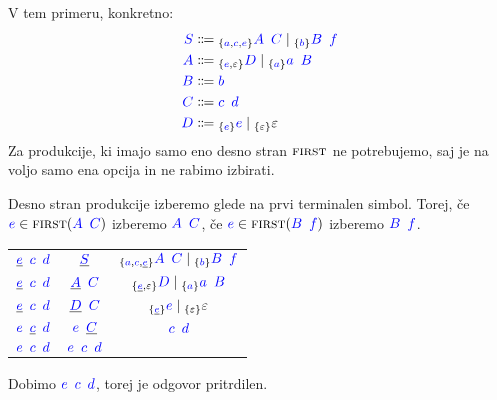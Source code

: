 \documentclass{article}
\newcommand{\FIRST}{\textsc{first}}
\newcommand{\Symbol}[1]{\textcolor{blue}{#1}}
\newcommand{\Null}{\varepsilon}
\newcommand{\Arrow}{\Coloneq}
\newcommand{\Seq}{{\ \,}}
\newcommand{\Union}{\mathrel{|}}
\newcommand{\Lookahead}[1]{{}_{\{{#1}\}}}
\begin{document}
V tem primeru, konkretno:
\begin{equation*}
  \begin{aligned}
    \Symbol{S} &\Arrow \Lookahead{\Symbol{a}, \Symbol{c}, \Symbol{e}} \Symbol{A} \Seq \Symbol{C} \Union \Lookahead{\Symbol{b}} \Symbol{B} \Seq \Symbol{f} \\
    \Symbol{A} &\Arrow \Lookahead{\Symbol{e}, \Null} \Symbol{D} \Union \Lookahead{\Symbol{a}} \Symbol{a} \Seq \Symbol{B} \\
    \Symbol{B} &\Arrow \Symbol{b}\\
    \Symbol{C} &\Arrow \Symbol{c} \Seq \Symbol{d}\\
    \Symbol{D} &\Arrow \Lookahead{\Symbol{e}} \Symbol{e} \Union \Lookahead{\Null} \Null
  \end{aligned}
\end{equation*}
Za produkcije, ki imajo samo eno desno stran $\FIRST$ ne potrebujemo, saj je na voljo samo ena opcija in ne rabimo izbirati.

Desno stran produkcije izberemo glede na prvi terminalen simbol.
Torej, če $\Symbol{e} \in \FIRST(\Symbol{A} \Seq \Symbol{C})$ izberemo $\Symbol{A} \Seq \Symbol{C}$, če $\Symbol{e} \in \FIRST(\Symbol{B} \Seq \Symbol{f})$ izberemo $\Symbol{B} \Seq \Symbol{f}$.
\begin{center}
\begin{tabular}{|c|c|c|}
  \hline
  $\underline{\Symbol{e}} \Seq \Symbol{c} \Seq \Symbol{d}$ & $\underline{\Symbol{S}}$ & $\Lookahead{\Symbol{a}, \Symbol{c}, \underline{\Symbol{e}}} \Symbol{A} \Seq \Symbol{C} \Union \Lookahead{\Symbol{b}} \Symbol{B} \Seq \Symbol{f}$ \\ 
  $\underline{\Symbol{e}} \Seq \Symbol{c} \Seq \Symbol{d}$ & $\underline{\Symbol{A}} \Seq \Symbol{C}$ & $\Lookahead{\underline{\Symbol{e}}, \Null} \Symbol{D} \Union \Lookahead{\Symbol{a}} \Symbol{a} \Seq \Symbol{B}$ \\ 
  $\underline{\Symbol{e}} \Seq \Symbol{c} \Seq \Symbol{d}$ & $\underline{\Symbol{D}} \Seq \Symbol{C}$ & $\Lookahead{\underline{\Symbol{e}}} \Symbol{e} \Union \Lookahead{\Null} \Null$ \\ 
  $\Symbol{e} \Seq \underline{\Symbol{c}} \Seq \Symbol{d}$ & $\Symbol{e} \Seq \underline{\Symbol{C}}$ & $\Symbol{c} \Seq \Symbol{d}$ \\ 
  \hline
  $\Symbol{e} \Seq \Symbol{c} \Seq \Symbol{d}$ & $\Symbol{e} \Seq \Symbol{c} \Seq \Symbol{d}$ & \\ 
  \hline
\end{tabular}
\end{center}
Dobimo $\Symbol{e} \Seq \Symbol{c} \Seq \Symbol{d}$, torej je odgovor pritrdilen.
\end{document}
